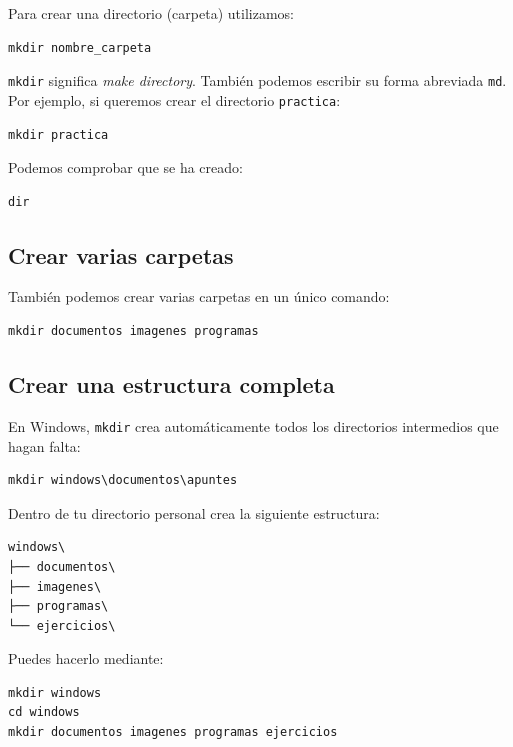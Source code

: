 \documentclass[11pt,a4paper]{article}
\begin{document}
Para crear una directorio (carpeta) utilizamos:

\begin{lstlisting}
mkdir nombre_carpeta
\end{lstlisting}

\noindent \texttt{mkdir} significa \textit{make directory}. También
podemos escribir su forma abreviada \texttt{md}. Por ejemplo, si
queremos crear el directorio \texttt{practica}:

\begin{lstlisting}
mkdir practica
\end{lstlisting}

\noindent Podemos comprobar que se ha creado:

\begin{lstlisting}
dir
\end{lstlisting}

\subsection{Crear varias carpetas}

También podemos crear varias carpetas en un único comando:

\begin{lstlisting}
mkdir documentos imagenes programas
\end{lstlisting}

\subsection{Crear una estructura completa}

En Windows, \texttt{mkdir} crea automáticamente todos los directorios
intermedios que hagan falta:

\begin{lstlisting}
mkdir windows\documentos\apuntes
\end{lstlisting}

\begin{ejercicio}
Dentro de tu directorio personal crea la siguiente estructura:

\begin{lstlisting}
windows\
├── documentos\
├── imagenes\
├── programas\
└── ejercicios\
\end{lstlisting}

Puedes hacerlo mediante:

\begin{lstlisting}
mkdir windows
cd windows
mkdir documentos imagenes programas ejercicios
\end{lstlisting}
\end{ejercicio}
\end{document}
